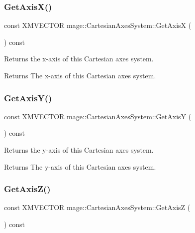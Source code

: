 \subsubsection{\texorpdfstring{Get\+Axis\+X()}{GetAxisX()}}
{\footnotesize\ttfamily const X\+M\+V\+E\+C\+T\+OR mage\+::\+Cartesian\+Axes\+System\+::\+Get\+AxisX (\begin{DoxyParamCaption}{ }\end{DoxyParamCaption}) const\hspace{0.3cm}{\ttfamily [noexcept]}}

Returns the x-\/axis of this Cartesian axes system.

\begin{DoxyReturn}{Returns}
The x-\/axis of this Cartesian axes system. 
\end{DoxyReturn}
\hypertarget{structmage_1_1_cartesian_axes_system_af93e2cc21d2a297b5fb449a2f4c2dcdf}{}\label{structmage_1_1_cartesian_axes_system_af93e2cc21d2a297b5fb449a2f4c2dcdf} 
\subsubsection{\texorpdfstring{Get\+Axis\+Y()}{GetAxisY()}}
{\footnotesize\ttfamily const X\+M\+V\+E\+C\+T\+OR mage\+::\+Cartesian\+Axes\+System\+::\+Get\+AxisY (\begin{DoxyParamCaption}{ }\end{DoxyParamCaption}) const\hspace{0.3cm}{\ttfamily [noexcept]}}

Returns the y-\/axis of this Cartesian axes system.

\begin{DoxyReturn}{Returns}
The y-\/axis of this Cartesian axes system. 
\end{DoxyReturn}
\hypertarget{structmage_1_1_cartesian_axes_system_a8809875b3e960531df80bca9e33e5ca6}{}\label{structmage_1_1_cartesian_axes_system_a8809875b3e960531df80bca9e33e5ca6} 
\subsubsection{\texorpdfstring{Get\+Axis\+Z()}{GetAxisZ()}}
{\footnotesize\ttfamily const X\+M\+V\+E\+C\+T\+OR mage\+::\+Cartesian\+Axes\+System\+::\+Get\+AxisZ (\begin{DoxyParamCaption}{ }\end{DoxyParamCaption}) const\hspace{0.3cm}{\ttfamily [noexcept]}}

